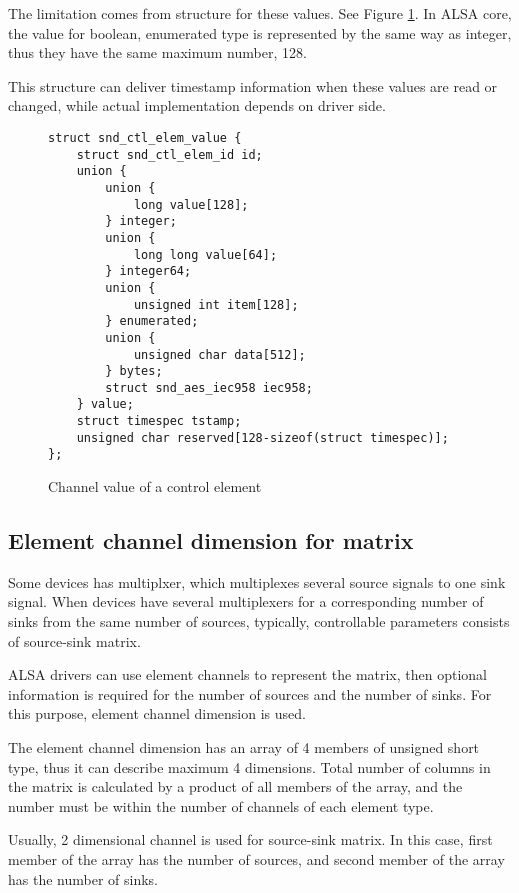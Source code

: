 \documentclass[onecolumn]{article}
\begin{document}
The limitation comes from structure for these values. See Figure \ref{fig:element-channel-value}. In ALSA core, the value for boolean, enumerated type is represented by the same way as integer, thus they have the same maximum number, 128.

This structure can deliver timestamp information when these values are read or changed, while actual implementation depends on driver side.

\begin{figure}[htbp]
\small
\begin{verbatim}
struct snd_ctl_elem_value {
    struct snd_ctl_elem_id id;
    union {
        union {
            long value[128];
        } integer;
        union {
            long long value[64];
        } integer64;
        union {
            unsigned int item[128];
        } enumerated;
        union {
            unsigned char data[512];
        } bytes;
        struct snd_aes_iec958 iec958;
    } value;
    struct timespec tstamp;
    unsigned char reserved[128-sizeof(struct timespec)];
};
\end{verbatim}
\caption{{Channel value of a control element }}
\label{fig:element-channel-value}
\end{figure}


\subsection{Element channel dimension for matrix}

Some devices has multiplxer, which multiplexes several source signals to one sink signal. When devices have several multiplexers for a corresponding number of sinks from the same number of sources, typically, controllable parameters consists of source-sink matrix.

ALSA drivers can use element channels to represent the matrix, then optional information is required for the number of sources and the number of sinks. For this purpose, element channel dimension is used.

The element channel dimension has an array of 4 members of unsigned short type, thus it can describe maximum 4 dimensions. Total number of columns in the matrix is calculated by a product of all members of the array, and the number must be within the number of channels of each element type.

Usually, 2 dimensional channel is used for source-sink matrix. In this case, first member of the array has the number of sources, and second member of the array has the number of sinks.
\end{document}
